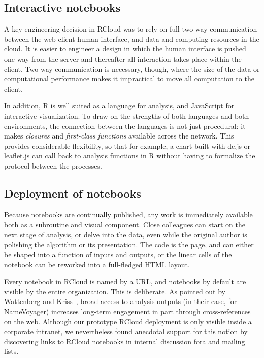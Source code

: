 \subsection{Interactive notebooks\label{sec:notebooks}}




A key engineering decision in RCloud was to rely on full two-way
communication between the web client human interface, and data and
computing resources in the cloud. It is easier to engineer a design
in which the human interface is pushed one-way from the server
and thereafter all interaction takes place within the client.
Two-way communication is necessary, though, where the size of
the data or computational performance makes it impractical to
move all computation to the client.

In addition, R is well suited as a language for analysis, and
JavaScript for interactive visualization. To draw on
the strengths of both languages and both environments, the connection
between the languages is not just procedural: it makes \emph{closures}
and \emph{first-class functions} available across the network.
This provides considerable flexibility, so that for example, a chart built
with dc.js or leaflet.js can call back to analysis functions in R
without having to formalize the protocol between the processes.

\subsection{Deployment of notebooks\label{sec:deployment}}

Because notebooks are continually published, any work is immediately
available both as a subroutine and visual component. Close colleagues
can start on the next stage of analysis, or delve into the data,
even while the original author is polishing the algorithm or its
presentation. The code is the page, and can either be shaped into
a function of inputs and outputs, or the linear cells of the notebook
can be reworked into a full-fledged HTML layout.

Every notebook in RCloud is named by a URL, and notebooks by
default are visible by the entire organization. This is deliberate.
As pointed out by Wattenberg and Kriss~\cite{Wattenberg:2011:DFS},
broad access to analysis outputs (in their case, for NameVoyager)
increases long-term engagement in part through cross-references on
the web. Although our prototype RCloud deployment is only visible
inside a corporate intranet, we nevertheless found anecdotal support
for this notion by discovering links to RCloud notebooks in internal
discussion fora and mailing lists.

